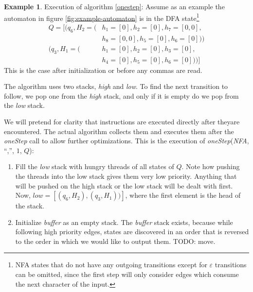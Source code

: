 \documentclass[english]{sigplanconf}
\theoremstyle{definition}
\newtheorem{example}{Example}[section]
\begin{document}
\begin{example} Execution of algorithm \ref{onestep}:
\label{ex:oneStep1}
Assume as an example the automaton in figure \ref{fig:example-automaton} is in the DFA state\footnote{NFA states that do not have any outgoing transitions except for $\varepsilon$ transitions can be omitted, since the first step will only consider edges which consume the next character of the input.} 
\begin{align*}
Q=[
	(q_6, H_2=(&h_1=[0], h_2=[0], h_7=[0,0], \\
	&h_8=[0,0], h_5=[0], h_6=[0])) \\
	(q_3, H_1=(&h_1=[0], h_2=[0], h_3=[0], \\
	&h_4=[0], h_5=[0], h_6=[0]))]
	\end{align*}
This is the case after initialization or before any commas are read.

The algorithm uses two stacks, \emph{high} and \emph{low}.
To find the next transition to follow, we pop one from the \emph{high} stack,
and only if it is empty do we pop from the \emph{low} stack.

We will pretend for clarity that instructions are executed directly
after theyare encountered.  The actual algorithm collects them and
executes them after the \emph{oneStep} call to allow further
optimizations.  This is the execution of \emph{oneStep}(\emph{NFA},
``,'', $1$, $Q$):

\begin{enumerate}
\item Fill the \emph{low} stack with hungry threads of all states of $Q$.
Note how pushing the threads into the low stack gives them very low priority.
Anything that will be pushed on the high stack or the low stack will be dealt with
first.
Now, $\mathit{low}=[(q_6, H_2), (q_3,H_1))]$, where the first element is the head of the stack.
\item Initialize \emph{buffer} as an empty stack. 
The \emph{buffer} stack exists, because while following high priority edges, states are discovered
in an order that is reversed to the order in which we would like to output them. TODO: move.


\end{enumerate}
\end{example}
\end{document}

